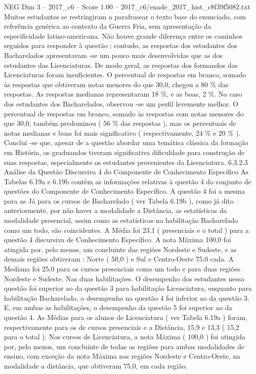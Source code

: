 \begin{textsample}{NEG Dim 3 – 2017\_c6 – Score 1.00 – 2017\_c6/enade\_2017\_hist\_c8f39f5082.txt}
Muitos estudantes se restringiram a parafrasear o texto base do enunciado, com referência genérica ao contexto da Guerra Fria, sem apresentação da especificidade latino-americana.
Não houve grande diferença entre os caminhos seguidos para responder à questão ; contudo, as respostas dos estudantes dos Bacharelados apresentavam -se um pouco mais desenvolvidas que as dos estudantes das Licenciaturas.
De modo geral, as respostas dos formandos das Licenciaturas foram insuficientes.
O percentual de respostas em branco, somado às respostas que obtiveram notas menores do que 30,0, chegou a 80 \% das respostas.
As respostas medianas representaram 18 \%, e as boas, 2 \%.
No caso dos estudantes dos Bacharelados, observou -se um perfil levemente melhor.
O percentual de respostas em branco, somado às respostas com notas menores do que 30,0, também predominou ( 56 \% das respostas ), mas os percentuais de notas medianas e boas foi mais significativo ( respectivamente, 24 \% e 20 \% ).
Conclui -se que, apesar de a questão abordar uma temática clássica da formação em História, os graduandos tiveram significativa dificuldade para construção de suas respostas, especialmente os estudantes provenientes da Licenciatura. 6.3.2.3 Análise da Questão Discursiva 4 do Componente de Conhecimento Específico As Tabelas 6.19a e 6.19b contém as informações relativas à questão 4 do conjunto de questões do Componente de Conhecimento Específico.
A questão 4 foi a mesma para as Já para os cursos de Bacharelado ( ver Tabela 6.19b ), como já dito anteriormente, por não haver a modalidade a Distância, as estatísticas da modalidade presencial, assim como as estatísticas na habilitação Bacharelado como um todo, são coincidentes.
A Média foi 23,1 ( presenciais e o total ) para a questão 4 discursiva de Conhecimento Específico.
A nota Máxima 100,0 foi atingida por, pelo menos, um concluinte das regiões Nordeste e Sudeste, e as demais regiões obtiveram : Norte ( 50,0 ) e Sul e Centro-Oeste 75,0 cada.
A Mediana foi 25,0 para os cursos presenciais como um todo e para duas regiões Nordeste e Sudeste.
Nas duas habilitações.
O desempenho dos estudantes nessa questão foi superior ao da questão 3 para habilitação Licenciatura, enquanto para habilitação Bacharelado, o desempenho na questão 4 foi inferior ao da questão 3.
E, em ambas as habilitações, o desempenho da questão 5 foi superior ao da questão 4.
As Médias para os alunos de Licenciatura ( ver Tabela 6.19a ) foram, respectivamente para os de cursos presenciais e a Distância, 15,9 e 13,3 ( 15,2 para o total ).
Nos cursos de Licenciatura, a nota Máxima ( 100,0 ) foi atingida por, pelo menos, um concluinte de todas as regiões para ambas modalidades de ensino, com exceção da nota Máxima nas regiões Nordeste e Centro-Oeste, na modalidade a distância, que obtiveram 75,0, em cada região.

\end{textsample}
